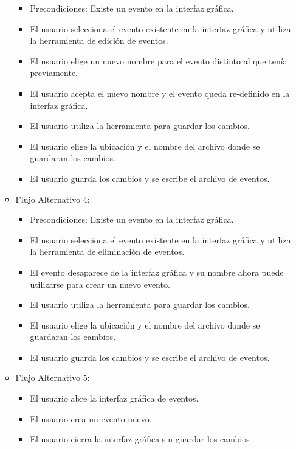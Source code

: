 \begin{itemize}
\begin{itemize}
\begin{itemize}
       		    \item Precondiciones: Existe un evento en la interfaz gráfica.       		  
       		    \item El usuario selecciona el evento existente en la interfaz
       		    gráfica y utiliza la herramienta de edición de eventos.
       		    \item El usuario elige un nuevo nombre para el evento distinto al
       		    que tenía previamente.
       		    \item El usuario acepta el nuevo nombre y el evento queda
       		    re-definido en la interfaz gráfica.
       		    \item El usuario utiliza la herramienta para guardar los cambios.
       		    \item El usuario elige la ubicación y el nombre del archivo donde
       		    se guardaran los cambios.
       		    \item El usuario guarda los cambios y se escribe el archivo de
       		    eventos.
	    	\end{itemize}
	    \item Flujo Alternativo 4:
	    	\begin{itemize}
       		    \item Precondiciones: Existe un evento en la interfaz gráfica.       		  
       		    \item El usuario selecciona el evento existente en la interfaz
       		    gráfica y utiliza la herramienta de eliminación de eventos.
       		    \item El evento desaparece de la interfaz gráfica y su nombre ahora
       		    puede utilizarse para crear un nuevo evento.
       		    \item El usuario utiliza la herramienta para guardar los cambios.
       		    \item El usuario elige la ubicación y el nombre del archivo donde
       		    se guardaran los cambios.
       		    \item El usuario guarda los cambios y se escribe el archivo de
       		    eventos.
	    	\end{itemize}
	    \item Flujo Alternativo 5:
	    	\begin{itemize}
	    	    \item El usuario abre la interfaz gráfica de eventos.
	    	    \item El usuario crea un evento nuevo.
	    	    \item El usuario cierra la interfaz gráfica sin guardar los cambios

\end{itemize}
\end{itemize}
\end{itemize}

